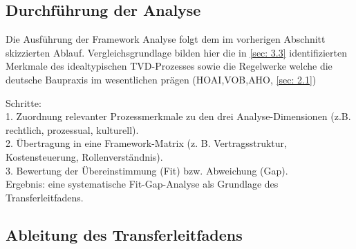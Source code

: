 \subsection{Durchführung der Analyse}
\label{sec: 3.4.3}

Die Ausführung der Framework Analyse folgt dem im vorherigen Abschnitt skizzierten Ablauf.
Vergleichsgrundlage bilden hier die in \cref{sec: 3.3} identifizierten Merkmale des idealtypischen  \ac{TVD}-Prozesses sowie die Regelwerke welche die deutsche Baupraxis im wesentlichen prägen (\acs{HOAI},\acs{VOB},\acs{AHO}, \cref{sec: 2.1})

Schritte:\\
1. Zuordnung relevanter Prozessmerkmale zu den drei Analyse-Dimensionen (z.B. rechtlich, prozessual, kulturell).\\
2. Übertragung in eine Framework-Matrix (z. B. Vertragsstruktur, Kostensteuerung, Rollenverständnis).\\
3. Bewertung der Übereinstimmung (Fit) bzw. Abweichung (Gap).\\
Ergebnis: eine systematische Fit-Gap-Analyse als Grundlage des Transferleitfadens.

\subsection{Ableitung des Transferleitfadens}
\label{sec: 3.4.4}


